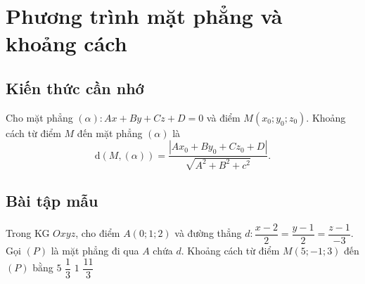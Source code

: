 \setcounter{section}{45}
\setcounter{ex}{0}
\section{Phương trình mặt phẳng và khoảng cách}
\subsection{Kiến thức cần nhớ}
\begin{khung}
	Cho mặt phẳng $(\alpha)\colon Ax+By+Cz+D=0$ và điểm $M\left(x_0;y_0;z_0\right)$. Khoảng cách từ điểm $M$ đến mặt phẳng $(\alpha)$ là $$\mathrm{d}(M,(\alpha))=\dfrac{\left|Ax_0+By_0+Cz_0+D\right|}{\sqrt{A^2+B^2+c^2}}.$$
\end{khung}
\subsection{Bài tập mẫu}
\begin{khung}
\begin{vd}%
	Trong KG $Oxyz$, cho điểm $A(0;1;2)$ và đường thẳng $d\colon\dfrac{x-2}{2}=\dfrac{y-1}{2}=\dfrac{z-1}{-3}$. Gọi $(P)$ là mặt phẳng đi qua $A$ chứa $d$. Khoảng cách từ điểm $M(5;-1;3)$ đến $(P)$ bằng 
	\choice
	{$5$}
	{$\dfrac{1}{3}$}
	{\True $1$}
	{$\dfrac{11}{3}$}
\end{vd}
\end{khung}
